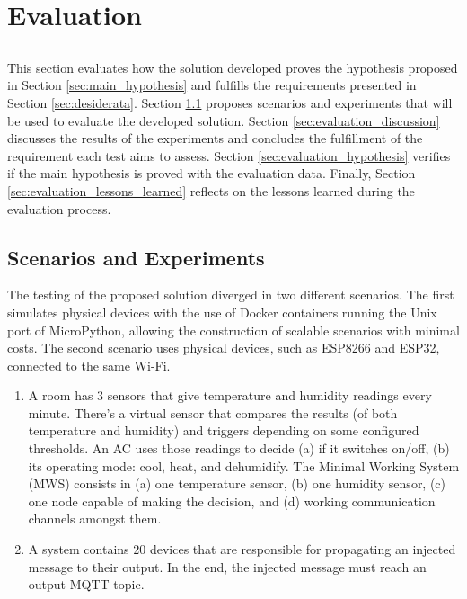 \chapter{Evaluation} \label{chap:evaluation} \minitoc

\section*{}

This section evaluates how the solution developed proves the hypothesis proposed in Section \ref{sec:main_hypothesis} and fulfills the requirements presented in Section \ref{sec:desiderata}. Section \ref{sec:scenarios_experiments} proposes scenarios and experiments that will be used to evaluate the developed solution. Section \ref{sec:evaluation_discussion} discusses the results of the experiments and concludes the fulfillment of the requirement each test aims to assess. Section \ref{sec:evaluation_hypothesis} verifies if the main hypothesis is proved with the evaluation data. Finally, Section \ref{sec:evaluation_lessons_learned} reflects on the lessons learned during the evaluation process. 

\section{Scenarios and Experiments}\label{sec:scenarios_experiments}

The testing of the proposed solution diverged in two different scenarios. The first simulates physical devices with the use of Docker containers running the Unix port of MicroPython, allowing the construction of scalable scenarios with minimal costs. The second scenario uses physical devices, such as ESP8266 and ESP32, connected to the same Wi-Fi.

\begin{enumerate}
    \item A room has 3 sensors that give temperature and humidity readings every minute. There’s a virtual sensor that compares the results (of both temperature and humidity) and triggers depending on some configured thresholds. An AC uses those readings to decide (a) if it switches on/off, (b) its operating mode: cool, heat, and dehumidify. The Minimal Working System (MWS) consists in (a) one temperature sensor, (b) one humidity sensor, (c) one node capable of making the decision, and (d) working communication channels amongst them.
    \item A system contains 20 devices that are responsible for propagating an injected message to their output. In the end, the injected message must reach an output MQTT topic.
\end{enumerate}

